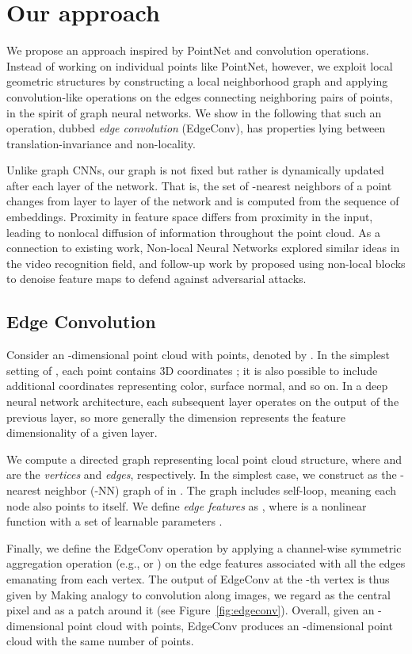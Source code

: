 \documentclass[acmtog]{acmart}
\begin{document}
 \section{Our approach}

We propose an approach inspired by PointNet and convolution operations. Instead of working on individual points like PointNet, however, we exploit local geometric structures by constructing a local neighborhood graph and applying convolution-like operations on the edges connecting neighboring pairs of points, in the spirit of graph neural networks. We show in the following that such an operation, dubbed \textit{edge convolution} (EdgeConv), has properties lying between translation-invariance and non-locality. 

Unlike graph CNNs, our graph is not fixed but rather is dynamically updated after each layer of the network. That is, the set of -nearest neighbors of a point changes from layer to layer of the network and is computed from the sequence of embeddings. Proximity in feature space differs from proximity in the input, leading to nonlocal diffusion of information throughout the point cloud. As a connection to existing work, Non-local Neural Networks \cite{NonLocal2018} explored similar ideas in the video recognition field, and follow-up work by \citet{xie2018feature} proposed using non-local blocks to denoise feature maps to defend against adversarial attacks.

\subsection{Edge Convolution} 
Consider an -dimensional point cloud with  points, denoted by . 
In the simplest setting of , each point contains 3D coordinates ; it is also possible to include additional coordinates representing color, surface normal, and so on. 
In a deep neural network architecture, each subsequent layer operates on the output of the previous layer, so more generally the dimension  represents the feature dimensionality of a given layer. 

We compute a directed graph  representing local point cloud structure, where  and  are the \textit{vertices} and \textit{edges}, respectively.
In the simplest case, we construct  as the -nearest neighbor (-NN) graph of  in . The graph includes self-loop, meaning each node also points to itself.
We define \textit{edge features} as , where  is a nonlinear function with a set of learnable  parameters . 
 
Finally, we define the EdgeConv operation by applying a channel-wise symmetric aggregation operation  (e.g.,  or ) on the edge features associated with all the edges emanating from each vertex. The output of EdgeConv at the -th vertex is thus given by 
Making analogy to convolution along images, we regard  as the central pixel and  as a patch around it (see Figure~\ref{fig:edgeconv}).  
Overall, given an -dimensional point cloud with  points, EdgeConv produces an -dimensional point cloud with the same number of points. 
\end{document}
